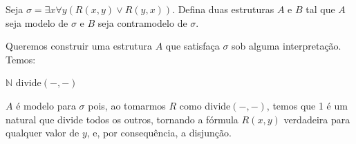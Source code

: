 \begin{rexercises}
            

    \begin{question}
        Seja $\sigma = \exists x \forall y(R(x,y) \lor R(y, x))$. Defina duas estruturas $A$ e $B$ tal que $A$ seja modelo de $\sigma$ e $B$ seja contramodelo de $\sigma$.
        \begin{resolution}
            Queremos construir uma estrutura $A$ que satisfaça $\sigma$ sob alguma interpretação. Temos:
            
            \begin{center}
                \begin{structure}
                    {$\mathbb{N}$}
                    {}
                    {divide$(-,-)$}
                    {}
                    {}
                    {}    
                \end{structure}
            \end{center}
           
            $A$ é modelo para $\sigma$ pois, ao tomarmos $R$ como divide$(-,-)$, temos que 1 é um natural que divide todos os outros, tornando a fórmula $R(x,y)$ verdadeira para qualquer valor de $y$, e, por consequência, a disjunção.


\end{resolution}
\end{question}
\end{rexercises}

